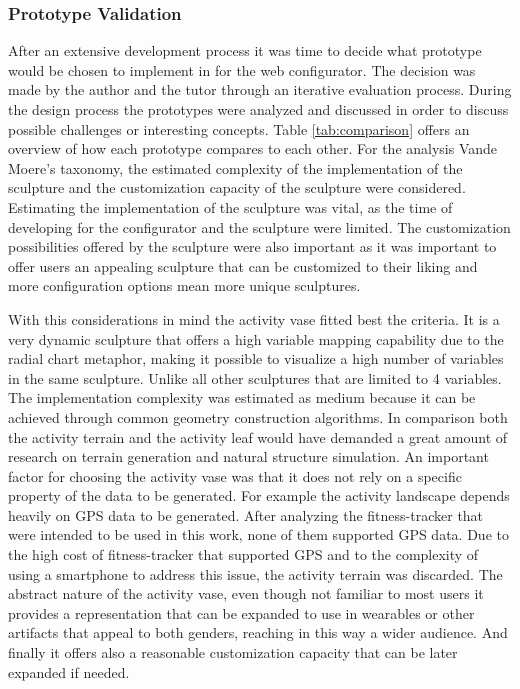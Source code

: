 \documentclass[../medieninformatik-arbeit.tex]{subfiles}
\begin{document}
\subsubsection{Prototype Validation}
After an extensive development process it was time to decide what prototype would be chosen to implement in for the web configurator. The decision was made by the author and the tutor through an iterative evaluation process. During the design process the prototypes were analyzed and discussed in order to discuss possible challenges or interesting concepts. Table \ref{tab:comparison} offers an overview of how each prototype compares to each other. For the analysis Vande Moere's taxonomy, the estimated complexity of the implementation of the sculpture and the customization capacity of the sculpture were considered. Estimating the implementation of the sculpture was vital, as the time of developing for the configurator and the sculpture were limited. The customization possibilities offered by the sculpture were also important as it was important to offer users an appealing sculpture that can be customized to their liking and more configuration options mean more unique sculptures. 

With this considerations in mind the activity vase fitted best the criteria. It is a very dynamic sculpture that offers a high variable mapping capability due to the radial chart metaphor, making it possible to visualize a high number of variables in the same sculpture. Unlike all other sculptures that are limited to 4 variables. The implementation complexity was estimated as medium because it can be achieved through common geometry construction algorithms. In comparison both the activity terrain and the activity leaf would have demanded a great amount of research on terrain generation and natural structure simulation. An important factor for choosing the activity vase was that it does not rely on a specific property of the data to be generated. For example the activity landscape depends heavily on GPS data to be generated. After analyzing the fitness-tracker that were intended to be used in this work, none of them supported GPS data. Due to the high cost of fitness-tracker that supported GPS and to the complexity of using a smartphone to address this issue, the activity terrain was discarded. The abstract nature of the activity vase, even though not familiar to most users it provides a representation that can be expanded to use in wearables or other artifacts that appeal to both genders, reaching in this way a wider audience. And finally it offers also a reasonable customization capacity that can be later expanded if needed. 
\end{document}
